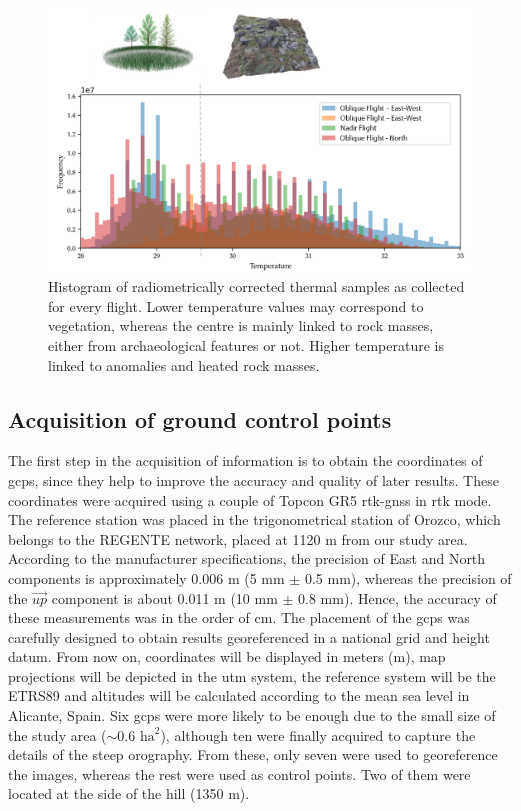 \begin{figure}[ht]
    \centering
    \includegraphics[width=.9\linewidth]{figs/castle_puerta_arenas/thermal_histogram.png}
	\caption{Histogram of radiometrically corrected thermal samples as collected for every flight. Lower temperature values may correspond to vegetation, whereas the centre is mainly linked to rock masses, either from archaeological features or not. Higher temperature is linked to anomalies and heated rock masses. }
	\label{fig:temp_histogram}
\end{figure}

\subsection{Acquisition of ground control points}

The first step in the acquisition of information is to obtain the coordinates of \acrshort{gcp}s, since they help to improve the accuracy and quality of later results. These coordinates were acquired using a couple of Topcon GR5 \acrshort{rtk}-\acrshort{gnss} in \acrshort{rtk} mode. The reference station was placed in the trigonometrical station of Orozco, which belongs to the REGENTE network, placed at 1120 \si{\meter} from our study area. According to the manufacturer specifications, the precision of East and North components is approximately 0.006 \si{\meter} (5 \si{\milli\meter} $\pm$ 0.5 \si{\milli\meter}), whereas the precision of the $\Vec{\textit{up}}$ component is about 0.011 \si{\meter} (10 \si{\milli\meter} $\pm$ 0.8 \si{\milli\meter}). Hence, the accuracy of these measurements was in the order of \si{\centi\meter}. The placement of the \acrshort{gcp}s was carefully designed to obtain results georeferenced in a national grid and height datum. From now on, coordinates will be displayed in meters (\si{\meter}), map projections will be depicted in the \acrshort{utm} system, the reference system will be the ETRS89 and altitudes will be calculated according to the mean sea level in Alicante, Spain. Six \acrshort{gcp}s were more likely to be enough due to the small size of the study area ($\sim$0.6 $\si{\hectare}^2$), although ten were finally acquired to capture the details of the steep orography. From these, only seven were used to georeference the images, whereas the rest were used as control points. Two of them were located at the side of the hill (1350 \si{\meter}).

